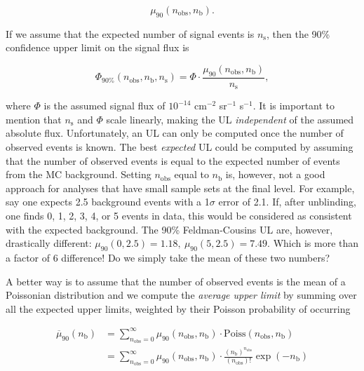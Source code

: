 \begin{equation}
\mu_{90} \left(n_\textrm{obs},n_\textrm{b}\right).
\end{equation}

\noindent If we assume that the expected number of signal events is $n_\textrm{s}$, then the 90\% confidence upper limit on the signal flux is

\begin{equation}
\label{eq:flux}
\Phi_{90\%}\left(n_\textrm{obs},n_\textrm{b},n_\textrm{s}\right) = \Phi \cdot  \frac{\mu_{90}\left(n_\textrm{obs},n_\textrm{b}\right)}{n_\textrm{s}},
\end{equation}

\noindent where $\Phi$ is the assumed signal flux of $10^{-14}$ cm$^{-2}$ sr$^{-1}$ s$^{-1}$. It is important to mention that $n_\textrm{s}$ and $\Phi$ scale linearly, making the UL \textit{independent} of the assumed absolute flux. Unfortunately, an UL can only be computed once the number of observed events is known. The best \textit{expected} UL could be computed by assuming that the number of observed events is equal to the expected number of events from the MC background. Setting $n_\textrm{obs}$ equal to $n_\textrm{b}$ is, however, not a good approach for analyses that have small sample sets at the final level. For example, say one expects 2.5 background events with a 1$\sigma$ error of 2.1. If, after unblinding, one finds 0, 1, 2, 3, 4, or 5 events in data, this would be considered as consistent with the expected background. The 90\% Feldman-Cousins UL are, however, drastically different: $\mu_{90}(0,2.5) = 1.18, \ \mu_{90}(5,2.5) = 7.49$. Which is more than a factor of 6 difference! Do we simply take the mean of these two numbers?

A better way is to assume that the number of observed events is the mean of a Poissonian distribution and we compute the \textit{average upper limit} by summing over all the expected upper limits, weighted by their Poisson probability of occurring \cite{Hill:2002nv}

\begin{equation}
\begin{split}
\overline{\mu}_{90}(n_\textrm{b}) &= \sum^{\infty}_{n_\textrm{obs}=0} \mu_{90}\left(n_\textrm{obs},n_\textrm{b}\right) \cdot \textrm{Poiss}\left(n_\textrm{obs},n_\textrm{b}\right)\\
&= \sum^{\infty}_{n_\textrm{obs}=0} \mu_{90}\left(n_\textrm{obs},n_\textrm{b}\right) \cdot \frac{\left(n_\textrm{b}\right)^{n_\textrm{obs}}}{\left(n_\textrm{obs}\right)!} \exp\left(-n_\textrm{b}\right)
\end{split}
\end{equation}

